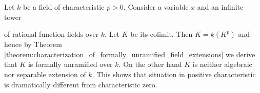 \begin{example}\label{example:formally_unramified_extension_of_fields_which_is_not_algebraic}
Let $k$ be a field of characteristic $p>0$. Consider a variable $x$ and an infinite tower
\begin{center}
\end{center}
of rational function fields over $k$. Let $K$ be its colimit. Then $K = k(K^p)$ and hence by Theorem \ref{theorem:characterization_of_formally_unramified_field_extensions} we derive that $K$ is formally unramified over $k$. On the other hand $K$ is neither algebraic nor separable extension of $k$. This shows that situation in positive characteristic is dramatically different from characteristic zero.
\end{example}























\small





